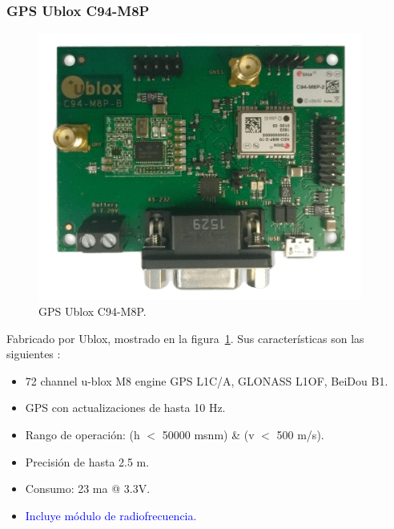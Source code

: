 \subsubsection{GPS Ublox C94-M8P}

\begin{figure}[H]
\centering
\includegraphics[width=0.95\textwidth]{Figures/ublox}
\caption[GPS Ublox C94-M8P.]{GPS Ublox C94-M8P.}
\label{fig:ubx}
\end{figure}

Fabricado por Ublox, mostrado en la figura~\ref{fig:ubx}. Sus características son las siguientes \citep{ubloxc94}:

\begin{itemize}
\item 72 channel u-blox M8 engine GPS L1C/A, GLONASS L1OF, BeiDou B1.\\
\item GPS con actualizaciones de hasta 10 Hz.\\
\item Rango de operación: (h $<$ 50000 msnm) \& (v $<$ 500 m/s).\\
\item Precisión de hasta 2.5 m.\\
\item Consumo: 23 ma @ 3.3V.\\
\item \textcolor{blue}{Incluye módulo de radiofrecuencia.}\\
\end{itemize}

